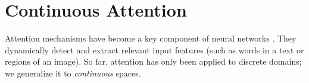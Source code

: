 \documentclass{article}
\newcommand{\andre}[1]{{\textcolor{blue}{\bf [{\sc Andre:} #1]}}}
\begin{document}
\begin{comment}
\andre{To do:  add the convexity proof. Our result is a bit more general: they assume theta is a minimal parametrization and the map btw theta and eta is one-to-one (their sec 3.1). We don't make this assumption (in fact, our discrete examples use overcomplete parameterizations).}

The case $\alpha=1$ recovers a well-known result: the gradient of the log-partition function is the expectation of the sufficient statistics.



\paragraph{Examples of $\alpha$-sparse families.}
Truncated parabola distributions, for varying location $\mu$ and scale $\sigma$, are a 2-sparse family. Take $\phi(t) = [t, t^2]$ and define the canonical parameters $\theta = [\frac{\mu}{\sigma^2}, -\frac{1}{2\sigma^2}]$.
From \eqref{eq:lambda_gaussian}, we obtain
\begin{equation*}
    A_2(\theta) = -\frac{1}{2}\left(\frac{3}{2\sigma}\right)^{2/3} + \frac{\mu^2}{2\sigma^2} + 1 = \left(\frac{9\theta_2}{16}\right)^{1/3} - \frac{\theta_1^2}{4\theta_2} + 1.
\end{equation*}
Likewise, Gaussians are an exponential family with the same sufficient statistics and canonical parameters, and $A_1(\theta) = -\frac{\theta_1^2}{4\theta_2} - \frac{1}{2}\log(-2\theta_2)$.
Truncated parabola and Gaussians are both particular cases of the so-called ``$q$-Gaussian'' \citep[\S 4.1]{naudts2009q}, for $q = 2-\alpha$. 
\andre{consider replacing by \citep[\S 6]{naudts2010q}}
Fig.~\ref{fig:gaussian_laplacian_distributions} (right) shows $(2-\alpha)$-Gaussian distributions for $\alpha \in [1,2]$. 

Triangular distributions, with a fixed location $\mu$ and varying scale $b$, also form a 2-sparse family (similarly to Laplace distributions with fixed location being exponential families).
\end{comment}



\section{Continuous Attention}\label{sec:attention}




Attention mechanisms have become a key component of  neural networks \citep{bahdanau2014neural,sukhbaatar2015end,vaswani2017attention}. They dynamically detect and extract relevant input features (such as words in a text or regions of an image). So far, attention has only been applied to discrete domains; we generalize it to {\it continuous} spaces.
\end{document}

